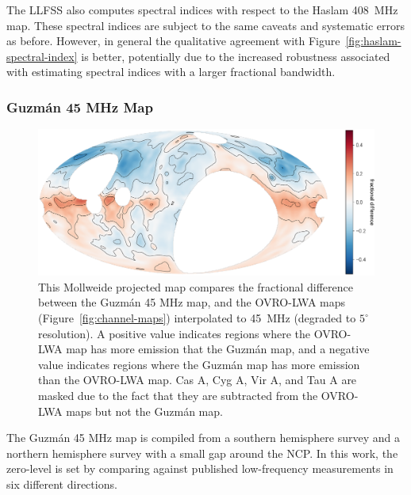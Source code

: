 \documentclass[twocolumn]{aastex61}
\begin{document}
The LLFSS also computes spectral indices with respect to the Haslam 408~MHz map. These spectral
indices are subject to the same caveats and systematic errors as before. However, in general the
qualitative agreement with Figure~\ref{fig:haslam-spectral-index} is better, potentially due to the
increased robustness associated with estimating spectral indices with a larger fractional bandwidth.

\subsubsection{Guzm\'{a}n 45 MHz Map}

\begin{figure}[t]
    \centering
    \includegraphics[height=0.32\textheight]{figures/guzman/guzman}
    \caption{
        This Mollweide projected map compares the fractional difference between the Guzm\'{a}n 45
        MHz map, and the OVRO-LWA maps (Figure~\ref{fig:channel-maps}) interpolated to 45~MHz
        (degraded to $5^\circ$ resolution). A positive value indicates regions where the OVRO-LWA
        map has more emission that the Guzm\'{a}n map, and a negative value indicates regions where
        the Guzm\'{a}n map has more emission than the OVRO-LWA map. Cas A, Cyg A, Vir A, and Tau A
        are masked due to the fact that they are subtracted from the OVRO-LWA maps but not the
        Guzm\'{a}n map.
    }
    \label{fig:guzman-comparison}
\end{figure}

The Guzm\'{a}n 45 MHz map \citep{2011A&A...525A.138G} is compiled from a southern hemisphere survey
\citep{1997A&AS..124..315A} and a northern hemisphere survey \citep{1999A&AS..140..145M} with a
small gap around the NCP. In this work, the zero-level is set by comparing against published
low-frequency measurements in six different directions.
\end{document}
